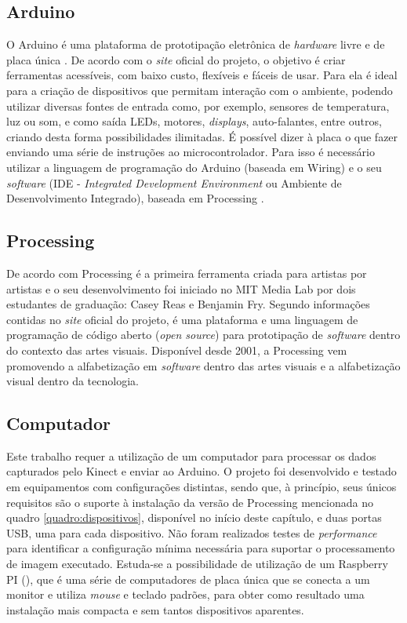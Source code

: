 \subsection{Arduino}

O Arduino é uma plataforma de prototipação eletrônica de \textit{hardware} livre e de placa única \cite{arduino}. De acordo com o \textit{site} oficial do projeto, o objetivo é criar ferramentas acessíveis, com baixo custo, flexíveis e fáceis de usar. Para  ela é ideal para a criação de dispositivos que permitam interação com o ambiente, podendo utilizar diversas fontes de entrada como, por exemplo, sensores de temperatura, luz ou som, e como saída LEDs, motores, \textit{displays}, auto-falantes, entre outros, criando desta forma possibilidades ilimitadas. É possível dizer à placa o que fazer enviando uma série de instruções ao microcontrolador. Para isso é necessário utilizar a linguagem de programação do Arduino (baseada em Wiring) e o seu \textit{software} (IDE - \textit{Integrated Development Environment} ou Ambiente de Desenvolvimento Integrado), baseada em Processing \cite{arduino}. 


\subsection{Processing}
\label{sec:processing}

De acordo com  Processing é a primeira ferramenta criada para artistas por artistas e o seu desenvolvimento foi iniciado no MIT Media Lab por dois estudantes de graduação: Casey Reas e Benjamin Fry. Segundo informações contidas no \textit{site} oficial do projeto,  é uma plataforma e uma linguagem de programação de código aberto (\textit{open source}) para prototipação de \textit{software} dentro do contexto das artes visuais. Disponível desde 2001, a Processing vem promovendo a alfabetização em \textit{software} dentro das artes visuais e a alfabetização visual dentro da tecnologia. 

\subsection{Computador}
\label{sec:computador}

Este trabalho requer a utilização de um computador para processar os dados capturados pelo Kinect e enviar ao Arduino. O projeto foi desenvolvido e testado em equipamentos com configurações distintas, sendo que, à princípio, seus únicos requisitos são o suporte à instalação da versão de Processing mencionada no quadro \ref{quadro:dispositivos}, disponível no início deste capítulo, e duas portas USB, uma para cada dispositivo. Não foram realizados testes de \textit{performance} para identificar a configuração mínima necessária para suportar o processamento de imagem executado. Estuda-se a possibilidade de utilização de um Raspberry PI (\citeyear{raspberry}), que é uma série de computadores de placa única que se conecta a um monitor e utiliza \textit{mouse} e teclado padrões, para obter como resultado uma instalação mais compacta e sem tantos dispositivos aparentes.



